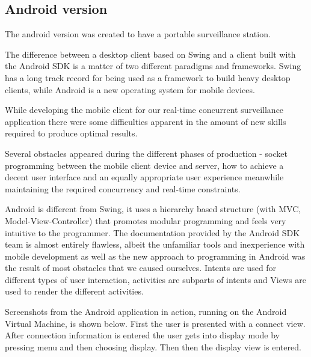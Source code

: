 \documentclass[8pt,titlepage]{article}
\begin{document}
\subsection{Android version}
The android version was created to have a portable surveillance station.

The difference between a desktop client based on Swing and a client built with the Android SDK is a matter of two different paradigms and frameworks. Swing has a long track record for being used as a framework to build heavy desktop clients, while Android is a new operating system for mobile devices. 

While developing the mobile client for our real-time concurrent surveillance application there were some difficulties apparent in the amount of new skills required to produce optimal results. 

Several obstacles appeared during the different phases of production - socket programming between the mobile client device and server, how to achieve a decent user interface and an equally appropriate user experience meanwhile maintaining the required concurrency and real-time constraints. 

Android is different from Swing, it uses a hierarchy based structure (with MVC, Model-View-Controller) that promotes modular programming and feels very intuitive to the programmer. The documentation provided by the Android SDK team is almost entirely flawless, albeit the unfamiliar tools and inexperience with mobile development as well as the new approach to programming in Android was the result of most obstacles that we caused ourselves.
Intents are used for different types of user interaction, activities are subparts of intents and Views are used to render the different activities. 

Screenshots from the Android application in action, running on the Android Virtual Machine, is shown below. First the user is presented with a connect view. After connection information is entered the user gets into display mode by pressing menu and then choosing display. Then then the display view is entered.
\end{document}
